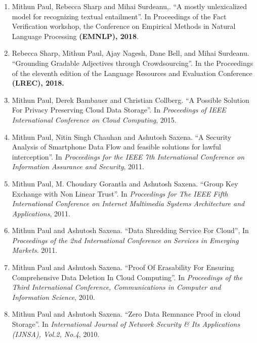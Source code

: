 \documentclass[10pt]{article}
\newcommand{\ve}[1]{{\em #1}} %
\newcommand{\ti}[1]{``#1''} %
\begin{document}
\begin{description}
\begin{enumerate}
\item Mithun Paul, Rebecca Sharp and Mihai Surdeanu,.   \ti{A mostly unlexicalized model for recognizing textual entailment}. In Proceedings of the Fact Verification workshop, the  Conference on Empirical Methods in Natural Language Processing \textbf{(EMNLP),  2018}.

\item Rebecca Sharp, Mithun Paul, Ajay Nagesh, Dane  Bell, and Mihai Surdeanu.   \ti{Grounding Gradable Adjectives through Crowdsourcing}. In the Proceedings of the eleventh edition of the Language Resources and Evaluation Conference \textbf{(LREC), 2018.}

\item Mithun Paul, Derek Bambauer and Christian Collberg.   \ti{A Possible Solution For Privacy Preserving Cloud Data Storage}. In \ve{Proceedings of IEEE International Conference on Cloud Computing}, 2015.

\item  Mithun Paul, Nitin Singh Chauhan and Ashutosh Saxena.   \ti{A Security Analysis of Smartphone Data Flow and feasible solutions for lawful interception}. In \ve{ Proceedings for the IEEE 7th International Conference on Information Assurance and Security}, 2011.

\item  Mithun Paul, M. Choudary Gorantla and Ashutosh Saxena.   \ti{Group Key Exchange with Non Linear Trust}. In \ve{ Proceedings for The IEEE Fifth International Conference on Internet Multimedia Systems Architecture and Applications}, 2011.

\item  Mithun Paul and Ashutosh Saxena.   \ti{Data Shredding Service For Cloud}, In \ve{  Proceedings of the 2nd International Conference on Services in Emerging Markets}. 2011.

\item  Mithun Paul and Ashutosh Saxena.   \ti{Proof Of Erasability For Ensuring Comprehensive Data Deletion In Cloud Computing}. In \ve{  Proceedings of the Third International Conference, Communications in Computer and Information Science}, 2010.

\item  Mithun Paul and Ashutosh Saxena.   \ti{Zero Data Remnance Proof in cloud Storage}. In \ve{  International Journal of Network Security \& Its Applications (IJNSA), Vol.2, No.4}, 2010.


\end{enumerate}



\end{description}
\end{document}
